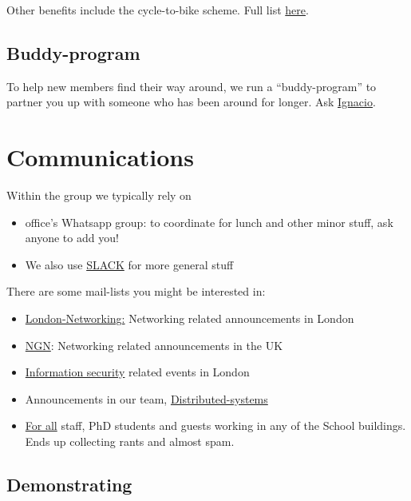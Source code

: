 \documentclass{article}
\begin{document}
Other benefits include the cycle-to-bike scheme. Full list  \href{http://www.hr.qmul.ac.uk/workqm/paygradingrewards/reward/benefits/index.html}{here}.

\subsection{Buddy-program}
To help new members find their way around, we run a ``buddy-program'' to partner you up with someone who has been around for longer. Ask \href{i.castro@qmul.ac.uk}{Ignacio}.


\section{Communications}

Within the group we typically rely on
\begin{itemize}
    \item office's Whatsapp group: to coordinate for lunch and other minor stuff, ask anyone to add you!
    \item We also use \href{qmul-distcomp.slack.com}{SLACK} for more general stuff
\end{itemize}    
    

There are some mail-lists you might be interested in:
\begin{itemize}
    \item \href{https://www.jiscmail.ac.uk/cgi-bin/webadmin?A0=LONDON-NETWORKING}{London-Networking:} Networking related announcements in London
    \item \href{https://www.jiscmail.ac.uk/cgi-bin/webadmin?SUBED1=NGN&A=1}{NGN}: Networking related announcements in the UK
    \item \href{mailto:LONDON-INFOSEC@jiscmail.ac.uk}{Information security} related events in London
    \item Announcements in our team, \href{mailto:distributed-computing@qmul.ac.uk}{Distributed-systems} 
    \item \href{mailto:residents@lists.eecs.qmul.ac.uk}{For all} staff, PhD students and guests working in any of the School buildings. Ends up collecting rants and almost spam. 
\end{itemize}

\subsection{Demonstrating}
\end{document}
